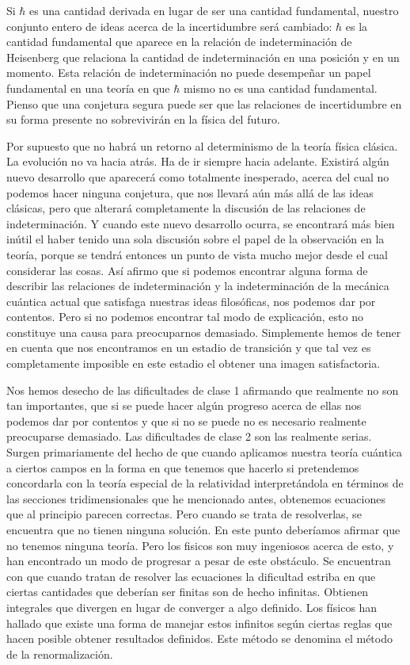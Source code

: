 \documentclass[a4paper, 12pt]{article}
\begin{document}
Si $\hbar$ es una cantidad derivada en lugar de ser una cantidad fundamental, nuestro conjunto entero de ideas acerca de la incertidumbre será cambiado: $\hbar$ es la cantidad fundamental que aparece en la relación de indeterminación de Heisenberg que relaciona la cantidad de indeterminación en una posición y en un momento. Esta relación de indeterminación no puede desempeñar un papel fundamental en una teoría en que $\hbar$ mismo no es una cantidad fundamental. Pienso que una conjetura segura puede ser que las relaciones de incertidumbre en su forma presente no sobrevivirán en la física del futuro.

Por supuesto que no habrá un retorno al determinismo de la teoría física clásica. La evolución no va hacia atrás. Ha de ir siempre hacia adelante. Existirá algún nuevo desarrollo que aparecerá como totalmente inesperado, acerca del cual no podemos hacer ninguna conjetura, que nos llevará aún más allá de las ideas clásicas, pero que alterará completamente la discusión de las relaciones de indeterminación. Y cuando este nuevo desarrollo ocurra, se encontrará más bien inútil el haber tenido una sola discusión sobre el papel de la observación en la teoría, porque se tendrá entonces un punto de vista mucho mejor desde el cual considerar las cosas. Así afirmo que si podemos encontrar alguna forma de describir las relaciones de indeterminación y la indeterminación de la mecánica cuántica actual que satisfaga  nuestras ideas filosóficas, nos podemos dar por contentos. Pero si no podemos encontrar tal modo de explicación, esto no constituye una causa para preocuparnos demasiado. Simplemente hemos de tener en cuenta que nos encontramos en un estadio de transición y que tal vez es completamente imposible en este estadio el obtener una imagen satisfactoria.




Nos hemos desecho de las dificultades de clase 1 afirmando que realmente no son tan importantes, que si se puede hacer algún progreso acerca de ellas nos podemos dar por contentos y que si no se puede no es necesario realmente preocuparse demasiado. Las dificultades de clase 2 son las realmente serias. Surgen primariamente del hecho de que cuando aplicamos nuestra teoría cuántica a ciertos campos en la forma en que tenemos que hacerlo si pretendemos concordarla con la teoría especial de la relatividad interpretándola en términos de las secciones tridimensionales que he mencionado antes, obtenemos ecuaciones que al principio parecen correctas. Pero cuando se trata de resolverlas, se encuentra que no tienen ninguna solución. En este punto deberíamos afirmar que no tenemos ninguna teoría. Pero los fisicos son muy ingeniosos acerca de esto, y han encontrado un modo de progresar a pesar de este obstáculo. Se encuentran con que cuando tratan de resolver las ecuaciones la dificultad estriba en que ciertas cantidades que deberían ser finitas son de hecho infinitas. Obtienen integrales que divergen en lugar de converger a algo definido. Los físicos han hallado que existe una forma de manejar estos infinitos según ciertas reglas que hacen posible obtener resultados definidos. Este método se denomina el método de la renormalización.
\end{document}
